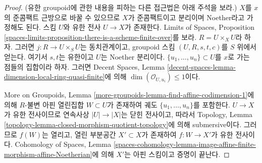 \begin{proof}
(유한 groupoid에 관한 내용을 피하는 다른 접근법은 아래 주석을 보라.)
$X$를 $x$의 준콤팩트 근방으로 바꿀 수 있으므로 $X$가 준콤팩트이고
분리이며 Noether라고 가정해도 된다.
스킴 $U$와 유한 전사 $U \to X$가 존재한다. Limits of Spaces,
Proposition \ref{spaces-limits-proposition-there-is-a-scheme-finite-over}를
보라. $R = U \times_X U$라 하자. 그러면
$j : R \to U \times_S U$는 동치관계이고, groupoid 스킴
$(U, R, s, t, c)$를 $S$ 위에서 얻는다. 여기서 $s, t$는 유한이고
$U$는 Noether 분리이다. $\{u_1, \ldots, u_n\} \subset U$를
$x$로 가는 점들의 집합이라 하자. 그러면 Decent Spaces,
Lemma \ref{decent-spaces-lemma-dimension-local-ring-quasi-finite}에 의해
$\dim(\mathcal{O}_{U, u_i}) \leq 1$이다.

\medskip\noindent
More on Groupoids, Lemma
\ref{more-groupoids-lemma-find-affine-codimension-1}에 의해 $R$-불변 아핀
열린집합 $W \subset U$가 존재하여 궤도
$\{u_1, \ldots, u_n\}$를 포함한다. $U \to X$가 유한 전사이므로 연속사상
$|U| \to |X|$는 닫힌 전사이고, 따라서 Topology, Lemma
\ref{topology-lemma-closed-morphism-quotient-topology}에 의해 submersive이다.
그러므로 $f(W)$는 열리고, 열린 부분공간 $X' \subset X$가 존재하여
$f : W \to X'$가 유한 전사이다.
Cohomology of Spaces, Lemma
\ref{spaces-cohomology-lemma-image-affine-finite-morphism-affine-Noetherian}에
의해 $X'$는 아핀 스킴이고 증명이 끝난다.
\end{proof}

